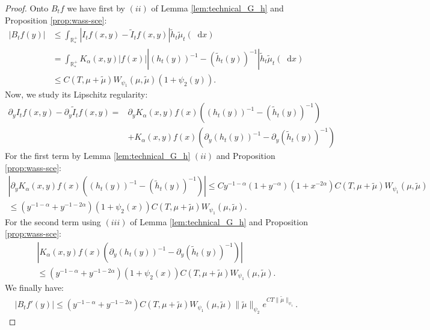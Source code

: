 \documentclass[11pt,a4paper]{article}
\newcommand{\RRP}{\mathbb{R}^+_*}
\newcommand{\dd}{\mathop{}\!\mathrm{d}}
\begin{document}
\begin{proof}
    Onto $B_tf$ we have first by $(ii)$ of Lemma \ref{lem:technical_G_h} and Proposition \ref{prop:wass-sce}:
    \begin{align*}
        \left|B_tf(y) \right| 
        &\leq \int_{\RRP} \left| I_tf(x,y) - \tilde{I}_tf(x,y)\right| \tilde{h}_t \tilde{\mu}_t(\dd x) \\
        &= \int_{\RRP} K_\alpha(x,y) |f(x)| \left| \left(h_t(y) \right)^{-1} - \left(\tilde{h}_t(y) \right)^{-1} \right| \tilde{h}_t \tilde{\mu}_t(\dd x) \\
        &\leq C(T,\mu + \tilde{\mu}) W_{\psi_1}(\mu,\tilde{\mu})   (1 + \psi_2(y)).
    \end{align*}
    Now, we study its Lipschitz regularity:
    \begin{align*}
        \partial_y I_tf(x,y) - \partial_y \tilde{I}_tf(x,y) 
        =& \partial_y K_\alpha(x,y) f(x)\left( \left(h_t(y) \right)^{-1} - \left(\tilde{h}_t(y) \right)^{-1} \right) \\
        &+  K_\alpha(x,y) f(x)\left( \partial_y \left(h_t(y) \right)^{-1} - \partial_y \left(\tilde{h}_t(y) \right)^{-1} \right) 
    \end{align*}
    For the first term by Lemma \ref{lem:technical_G_h} $(ii)$ and Proposition \ref{prop:wass-sce}:
    \begin{align*}
        \left| \partial_y K_\alpha(x,y) f(x)\left( \left(h_t(y) \right)^{-1} - \left(\tilde{h}_t(y) \right)^{-1} \right) \right| 
        \leq C y^{-1-\alpha} (1 + y^{-\alpha}) (1 + x^{-2\alpha}) C(T,\mu + \tilde{\mu}) W_{\psi_1}(\mu,\tilde{\mu}) \\
        \leq (y^{-1-\alpha} + y^{-1-2\alpha})(1 + \psi_2(x)) C(T,\mu + \tilde{\mu})  W_{\psi_1}(\mu,\tilde{\mu}).
    \end{align*}
    For the second term using $(iii)$ of Lemma \ref{lem:technical_G_h} and Proposition \ref{prop:wass-sce}:
    \begin{multline*}
        \left| K_\alpha(x,y) f(x)\left( \partial_y \left(h_t(y) \right)^{-1} - \partial_y \left(\tilde{h}_t(y) \right)^{-1} \right) \right| \\
        \leq (y^{-1-\alpha} + y^{-1-2\alpha})(1 + \psi_2(x)) C(T,\mu + \tilde{\mu})  W_{\psi_1}(\mu,\tilde{\mu}).
    \end{multline*}
    We finally have:
    \begin{align*}
        \left| B_tf'(y)\right| \leq (y^{-1-\alpha} + y^{-1-2\alpha})C(T,\mu + \tilde{\mu})  W_{\psi_1}(\mu,\tilde{\mu}) \|\tilde{\mu}\|_{\psi_2} e^{CT\|\tilde{\mu}\|_{\psi_1}}.
    \end{align*}

\end{proof}
\end{document}
